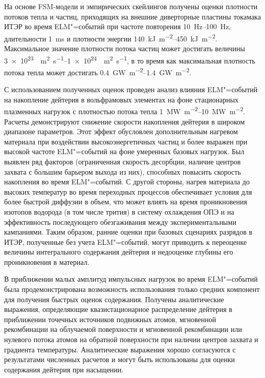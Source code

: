 На основе FSM-модели и эмпирических скейлингов получены оценки плотности потоков тепла и частиц, приходящих на внешние диверторные пластины токамака ИТЭР во время ELM"=событий при частоте повторения \SIrange{10}{100}{\hertz}, длительности \SI{1}{\milli\second} и плотности энергии \SIrange{140}{450}{\kilo\joule\per\meter\squared}. Максимальное значение плотности потока частиц может достигать величины \SIrange{3e23}{1e24}{\per\meter\squared\per\second}, в то время как максимальная плотность потока тепла может достигать \SIrange{0.4}{1.4}{\giga\watt\per\meter\squared}.

С использованием полученных оценок проведен анализ влияния ELM"=событий на накопление дейтерия в вольфрамовых элементах на фоне стационарных плазменных нагрузок с плотностью потока тепла \SIrange{1}{10}{\mega\watt\per\meter\squared}. Расчеты демонстрируют снижение скорости накопления дейтерия в широком диапазоне параметров. Этот эффект обусловлен дополнительным нагревом материала при воздействии высокоэнергетичных частиц и более выражен при высокой частоте ELM"=событий на фоне умеренных базовых нагрузок. Был выявлен ряд факторов (ограниченная скорость десорбции, наличие центров захвата с большим барьером выхода из них), способных повысить скорость накопления во время ELM"=событий. С другой стороны, нагрев материала до высоких температур во время переходных процессов обеспечивает условия для более быстрой диффузии в объем, что может влиять на время проникновения изотопов водорода (в том числе трития) в систему охлаждения ОПЭ и на эффективность последующего обезгаживания между экспериментальными кампаниями. Таким образом, ранние оценки при базовых сценариях разрядов в ИТЭР, полученные без учета ELM"=событий, могут приводить к переоценке величины интегрального содержания дейтерия и недооценке глубины его проникновения в материал.

В приближении малых амплитуд импульсных нагрузок во время ELM"=событий была продемонстрирована возможность использования только средних компонент для получения быстрых оценок содержания. Получены аналитические выражения, определяющие квазистационарное распределение дейтерия в приближении точечных источников подвижных атомов, мгновенной рекомбинации на облучаемой поверхности и мгновенной рекомбинации или нулевого потока атомов на обратной поверхности при наличии центров захвата и градиента температуры. Аналитические выражения хорошо согласуются с результатами численных расчетов и могут быть использованы для оценки содержания дейтерия при насыщении.

\clearpage

